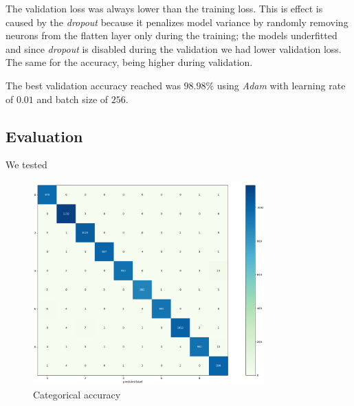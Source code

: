 \documentclass[compsoc]{IEEEtran}
\begin{document}
The validation loss was always lower than the training loss. This is effect is caused by the \emph{dropout} because it penalizes model variance by randomly removing neurons from the flatten layer only during the training; the models underfitted and since \emph{dropout} is disabled during the validation we had lower validation loss. The same for the accuracy, being higher during validation.\par
The best validation accuracy reached was $98.98\%$ using \emph{Adam} with learning rate of $0.01$ and batch size of $256$.


\subsection{Evaluation}
We tested 

\begin{figure}[ht!]
\centering                                                                        
\includegraphics[width=3.5in]{cm2.png}
\captionsetup{justification=centering}                                                                                         
\caption{Categorical accuracy}
\label{fig:cm}                                                                                                                               
\end{figure}
\end{document}
